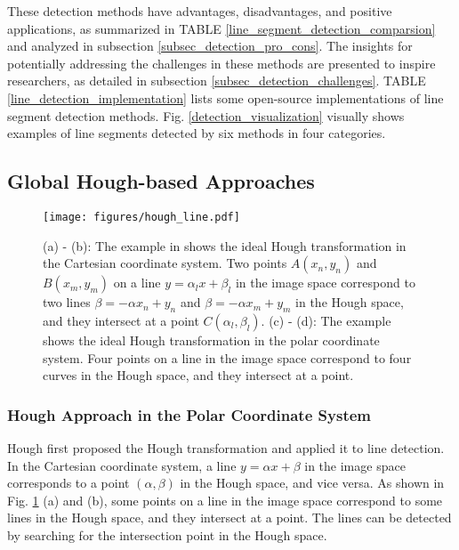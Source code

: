 \documentclass[journal,compsoc]{IEEEtran}
\begin{document}
These detection methods have advantages, disadvantages, and positive applications, as summarized in TABLE \ref{line_segment_detection_comparsion} and analyzed in subsection \ref{subsec_detection_pro_cons}. The insights for potentially addressing the challenges in these methods are presented to inspire researchers, as detailed in subsection \ref{subsec_detection_challenges}. TABLE \ref{line_detection_implementation} lists some open-source implementations of line segment detection methods. Fig. \ref{detection_visualization} visually shows examples of line segments detected by six methods in four categories.

\subsection{Global Hough-based Approaches}
\label{subsec_detection_hough}

\begin{figure}[tbp]
	\centering
	\texttt{[image: figures/hough\_line.pdf]}
	\caption{(a) - (b): The example in \cite{ExtendedHoughtransformforlinearfeaturedetection} shows the ideal Hough transformation in the Cartesian coordinate system. Two points $A(x_n, y_n)$ and $B(x_m, y_m)$ on a line $y=\alpha_lx+\beta_l$ in the image space correspond to two lines $\beta=-\alpha x_n + y_n$ and $\beta=-\alpha x_m + y_m$ in the Hough space, and they intersect at a point $C(\alpha_l, \beta_l)$. (c) - (d): The example shows the ideal Hough transformation in the polar coordinate system. Four points on a line in the image space correspond to four curves in the Hough space, and they intersect at a point.}
	\label{hough_line}
\end{figure}

\subsubsection{Hough Approach in the Polar Coordinate System}
Hough first proposed the Hough transformation \cite{METHODANDMEANSFORRECOGNIZINGCOMPLEXPATTERNS} and applied it to line detection. In the Cartesian coordinate system, a line $y=\alpha x + \beta$ in the image space corresponds to a point $(\alpha, \beta)$ in the Hough space, and vice versa. As shown in Fig. \ref{hough_line} (a) and (b), some points on a line in the image space correspond to some lines in the Hough space, and they intersect at a point. The lines can be detected by searching for the intersection point in the Hough space.
\end{document}
